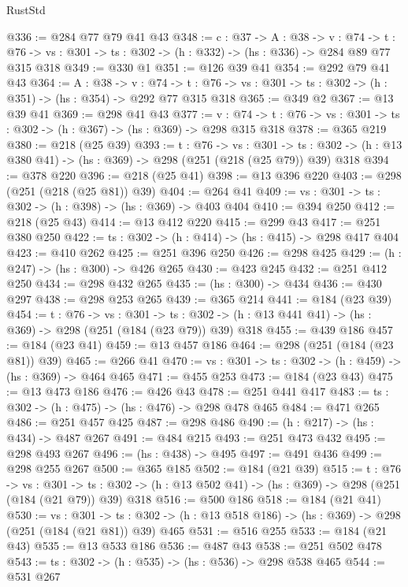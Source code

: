 \begin{lexlean}{RustStd}
\begin{coremodule}
@336 := @284 @77 @79 @41 @43
@348 := {c : @37} ->
  {A : @38} ->
  {v : @74} ->
  {t : @76} -> {vs : @301} -> {ts : @302} -> (h : @332) -> (hs : @336) -> @284 @89 @77 @315 @318
@349 := @330 @1
@351 := @126 @39 @41
@354 := @292 @79 @41 @43
@364 := {A : @38} ->
  {v : @74} ->
  {t : @76} -> {vs : @301} -> {ts : @302} -> (h : @351) -> (hs : @354) -> @292 @77 @315 @318
@365 := @349 @2
@367 := @13 @39 @41
@369 := @298 @41 @43
@377 := {v : @74} ->
  {t : @76} -> {vs : @301} -> {ts : @302} -> (h : @367) -> (hs : @369) -> @298 @315 @318
@378 := @365 @219
@380 := @218 (@25 @39)
@393 := {t : @76} ->
  {vs : @301} ->
  {ts : @302} -> (h : @13 @380 @41) -> (hs : @369) -> @298 (@251 (@218 (@25 @79)) @39) @318
@394 := @378 @220
@396 := @218 (@25 @41)
@398 := @13 @396 @220
@403 := @298 (@251 (@218 (@25 @81)) @39)
@404 := @264 @41
@409 := {vs : @301} -> {ts : @302} -> (h : @398) -> (hs : @369) -> @403 @404
@410 := @394 @250
@412 := @218 (@25 @43)
@414 := @13 @412 @220
@415 := @299 @43
@417 := @251 @380 @250
@422 := {ts : @302} -> (h : @414) -> (hs : @415) -> @298 @417 @404
@423 := @410 @262
@425 := @251 @396 @250
@426 := @298 @425
@429 := (h : @247) -> (hs : @300) -> @426 @265
@430 := @423 @245
@432 := @251 @412 @250
@434 := @298 @432 @265
@435 := (hs : @300) -> @434
@436 := @430 @297
@438 := @298 @253 @265
@439 := @365 @214
@441 := @184 (@23 @39)
@454 := {t : @76} ->
  {vs : @301} ->
  {ts : @302} -> (h : @13 @441 @41) -> (hs : @369) -> @298 (@251 (@184 (@23 @79)) @39) @318
@455 := @439 @186
@457 := @184 (@23 @41)
@459 := @13 @457 @186
@464 := @298 (@251 (@184 (@23 @81)) @39)
@465 := @266 @41
@470 := {vs : @301} -> {ts : @302} -> (h : @459) -> (hs : @369) -> @464 @465
@471 := @455 @253
@473 := @184 (@23 @43)
@475 := @13 @473 @186
@476 := @426 @43
@478 := @251 @441 @417
@483 := {ts : @302} -> (h : @475) -> (hs : @476) -> @298 @478 @465
@484 := @471 @265
@486 := @251 @457 @425
@487 := @298 @486
@490 := (h : @217) -> (hs : @434) -> @487 @267
@491 := @484 @215
@493 := @251 @473 @432
@495 := @298 @493 @267
@496 := (hs : @438) -> @495
@497 := @491 @436
@499 := @298 @255 @267
@500 := @365 @185
@502 := @184 (@21 @39)
@515 := {t : @76} ->
  {vs : @301} ->
  {ts : @302} -> (h : @13 @502 @41) -> (hs : @369) -> @298 (@251 (@184 (@21 @79)) @39) @318
@516 := @500 @186
@518 := @184 (@21 @41)
@530 := {vs : @301} ->
  {ts : @302} -> (h : @13 @518 @186) -> (hs : @369) -> @298 (@251 (@184 (@21 @81)) @39) @465
@531 := @516 @255
@533 := @184 (@21 @43)
@535 := @13 @533 @186
@536 := @487 @43
@538 := @251 @502 @478
@543 := {ts : @302} -> (h : @535) -> (hs : @536) -> @298 @538 @465
@544 := @531 @267

\end{coremodule}
\end{lexlean}
